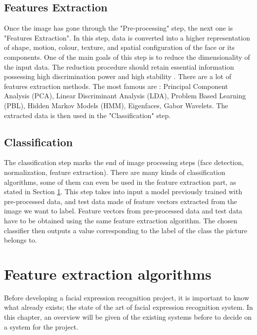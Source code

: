 \subsection{Features Extraction}

\vspace{\baselineskip}
\noindent Once the image has gone through the "Pre-processing" step, the next one is "Features Extraction". In this step, data is converted into a higher representation of shape, motion, colour, texture, and spatial configuration of the face or its components. One of the main goals of this step is to reduce the dimensionality of the input data. The reduction procedure should retain essential information possessing high discrimination power and high stability \cite{CHI03}. There are a lot of features extraction methods. The most famous are : Principal Component Analysis (PCA), Linear Discriminant Analysis (LDA), Problem Based Learning (PBL), Hidden Markov Models (HMM), Eigenfaces, Gabor Wavelets. The extracted data is then used in the "Classification" step.
\newline

\subsection{Classification}

\noindent The classification step marks the end of image processing steps (face detection, normalization, feature extraction). There are many kinds of classification algorithms, some of them can even be used in the feature extraction part, as stated in Section \ref{feat_x}. This step takes into input a model  previously trained with pre-processed data, and test data made of feature vectors extracted from the image we want to label. Feature vectors from pre-processed data and test data have to be obtained using the same feature extraction algorithm. The chosen classifier then outputs a value corresponding to the label of the class the picture belongs to.

\section{Feature extraction algorithms} \label{feat_x}

\vspace{\baselineskip}
\noindent Before developing a facial expression recognition project, it is important to know what already exists; the state of the art of facial expression recognition system. In this chapter, an overview will be given of the existing systems before to decide on a system for the project.
\newline

